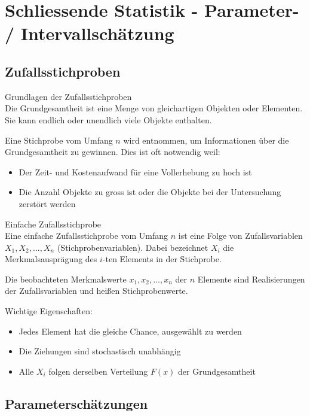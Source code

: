 \section{Schliessende Statistik - Parameter- / Intervallschätzung}

\subsection{Zufallsstichproben}

\begin{concept}{Grundlagen der Zufallsstichproben}\\
Die Grundgesamtheit ist eine Menge von gleichartigen Objekten oder Elementen. Sie kann endlich oder unendlich viele Objekte enthalten.

Eine Stichprobe vom Umfang $n$ wird entnommen, um Informationen über die Grundgesamtheit zu gewinnen. Dies ist oft notwendig weil:
\begin{itemize}
  \item Der Zeit- und Kostenaufwand für eine Vollerhebung zu hoch ist
  \item Die Anzahl Objekte zu gross ist oder die Objekte bei der Untersuchung zerstört werden
\end{itemize}
\end{concept}

\begin{definition}{Einfache Zufallsstichprobe}\\
Eine einfache Zufallsstichprobe vom Umfang $n$ ist eine Folge von Zufallsvariablen $X_1, X_2, \ldots, X_n$ (Stichprobenvariablen). Dabei bezeichnet $X_i$ die Merkmalsausprägung des $i$-ten Elements in der Stichprobe.

Die beobachteten Merkmalswerte $x_1, x_2, \ldots, x_n$ der $n$ Elemente sind Realisierungen der Zufallsvariablen und heißen Stichprobenwerte.

Wichtige Eigenschaften:
\begin{itemize}
  \item Jedes Element hat die gleiche Chance, ausgewählt zu werden
  \item Die Ziehungen sind stochastisch unabhängig 
  \item Alle $X_i$ folgen derselben Verteilung $F(x)$ der Grundgesamtheit
\end{itemize}
\end{definition}

\subsection{Parameterschätzungen}

